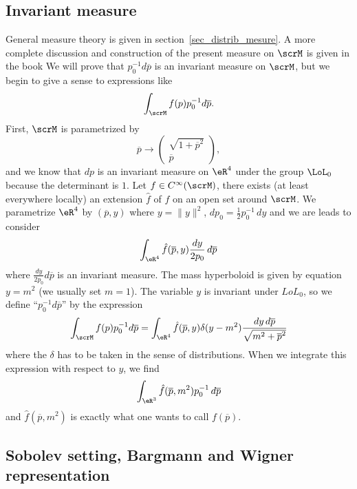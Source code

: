 \subsection{Invariant measure}

General measure theory is given in section~\ref{sec_distrib_mesure}. A more complete discussion and construction of the present measure on $\scrM$ is given in the book \cite{Reed_Simon} We will prove that $p_0^{-1}d\overline{p}$ is an invariant measure on $\scrM$, but we begin to give a sense to expressions like
\[
  \int_{\scrM} f(p)p_0^{-1}d\overline{p}.
\]
First, $\scrM$ is parametrized by
\[
  \overline{p}\to
\begin{pmatrix}
\sqrt{1+\overline{p}^2}\\\overline{p}
\end{pmatrix},
\]
and we know that $dp$ is an invariant measure on $\eR^4$ under the group $\LoL_0$ because the determinant is $1$. Let $f\in C^{\infty}(\scrM)$, there exists (at least everywhere locally) an extension $\hat f$ of $f$ on an open set around $\scrM$. We parametrize $\eR^4$ by $(\overline{p},y)$ where $y=\| y \|^2$, $dp_0=\frac{ 1 }{2}p_0^{-1}\,dy$ and we are leads to consider
\[
  \int_{\eR^4}\hat f(\overline{p},y)\frac{ dy }{ 2p_0 }\,d\overline{p}
\]
where $\frac{ dy }{ 2p_0 }d\overline{p}$ is an invariant measure. The mass hyperboloid is given by equation $y=m^2$ (we usually set $m=1$). The variable $y$ is invariant under $LoL_0$, so we define ``$p_0^{-1}d\overline{p}$'' by the expression
\begin{equation}
  \int_{\scrM}f(p)p_0^{-1}d\overline{p}= \int_{\eR^4}\hat f(\overline{p},y)\delta(y-m^2)\frac{ dy\,d\overline{p} }{ \sqrt{m^2+\overline{p}^2} }
\end{equation}
where the $\delta$ has to be taken in the sense of distributions. When we integrate this expression with respect to $y$, we find
\[
  \int_{\eR^3}\hat f(\overline{p},m^2)p_0^{-1}\,d\overline{p}
\]
and $\hat f(\overline{p},m^2)$ is exactly what one wants to call $f(\overline{p})$.

\subsection{Sobolev setting, Bargmann and Wigner representation}

